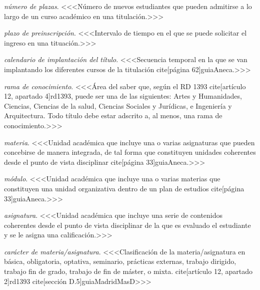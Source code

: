     \item \emph{número de plazas}. <<<Número de nuevos estudiantes que pueden admitirse a lo largo de un curso académico en una titulación.>>>

    \item \emph{plazo de preinscripción}. <<<Intervalo de tiempo en el que se puede solicitar el ingreso en una tituación.>>>

    \item \emph{calendario de implantación del título}. <<<Secuencia temporal en la que se van implantando los diferentes cursos de la titulación cite[página 62]{guiaAneca}.>>>

    \item \emph{rama de conocimiento}. <<<Área del saber que, según el RD 1393 cite[artículo 12, apartado 4]{rd1393}, puede ser una de las siguientes: Artes y Humanidades, Ciencias, Ciencias de la salud, Ciencias Sociales y Jurídicas, e Ingeniería y Arquitectura. Todo título debe estar adscrito a, al menos, una rama de conocimiento.>>>

    \item \emph{materia}. <<<Unidad académica que incluye una o varias asignaturas que pueden concebirse de manera integrada, de tal forma que constituyen unidades coherentes desde el punto de vista disciplinar cite[página 33]{guiaAneca}.>>>

    \item \emph{módulo}. <<<Unidad académica que incluye una o varias materias que constituyen una unidad organizativa dentro de un plan de estudios cite[página 33]{guiaAneca}.>>>

    \item \emph{asignatura}. <<<Unidad académica que incluye una serie de contenidos coherentes desde el punto de vista disciplinar de la que es evaluado el estudiante y se le asigna una calificación.>>>

    \item \emph{carácter de materia/asignatura}. <<<Clasificación de la materia/asignatura en básica, obligatoria, optativa, seminario, prácticas externas, trabajo dirigido, trabajo fin de grado, trabajo de fin de máster, o mixta. cite[artículo 12, apartado 2]{rd1393} cite[sección D.5]{guiaMadridMasD}>>>

